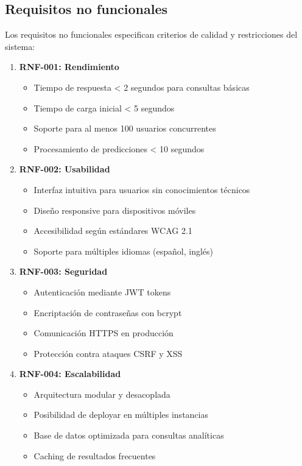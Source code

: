 \subsection{Requisitos no funcionales}

Los requisitos no funcionales especifican criterios de calidad y restricciones del sistema:

\begin{enumerate}
    \item \textbf{RNF-001: Rendimiento}
    \begin{itemize}
        \item Tiempo de respuesta < 2 segundos para consultas básicas
        \item Tiempo de carga inicial < 5 segundos
        \item Soporte para al menos 100 usuarios concurrentes
        \item Procesamiento de predicciones < 10 segundos
    \end{itemize}
    
    \item \textbf{RNF-002: Usabilidad}
    \begin{itemize}
        \item Interfaz intuitiva para usuarios sin conocimientos técnicos
        \item Diseño responsive para dispositivos móviles
        \item Accesibilidad según estándares WCAG 2.1
        \item Soporte para múltiples idiomas (español, inglés)
    \end{itemize}
    
    \item \textbf{RNF-003: Seguridad}
    \begin{itemize}
        \item Autenticación mediante JWT tokens
        \item Encriptación de contraseñas con bcrypt
        \item Comunicación HTTPS en producción
        \item Protección contra ataques CSRF y XSS
    \end{itemize}
    
    \item \textbf{RNF-004: Escalabilidad}
    \begin{itemize}
        \item Arquitectura modular y desacoplada
        \item Posibilidad de deployar en múltiples instancias
        \item Base de datos optimizada para consultas analíticas
        \item Caching de resultados frecuentes
    \end{itemize}
    

\end{enumerate}
